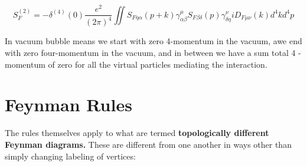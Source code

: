 \begin{qt}
    \begin{equation}
S_{F}^{(2)}=-\delta^{(4)}(0) \frac{e^{2}}{(2 \pi)^{4}} \iint S_{F \eta \alpha}(p+k) \gamma_{\alpha \beta}^{\mu} S_{F \beta \delta}(p) \gamma_{\delta \eta}^{\nu} i D_{F \mu \nu}(k) d^{4} k d^{4} p
\end{equation}
\end{qt}
In vacuum bubble means we start with zero 4-momentum in the vacuum, awe end with zero four-momentum in the vacuum, and in between we have a sum total 4 -momentum of zero for all the virtual particles mediating the interaction.

\section{Feynman Rules}
The rules themselves apply to what are termed \textbf{topologically different Feynman diagrams.} These are different from one another in ways other than simply changing labeling of vertices:
